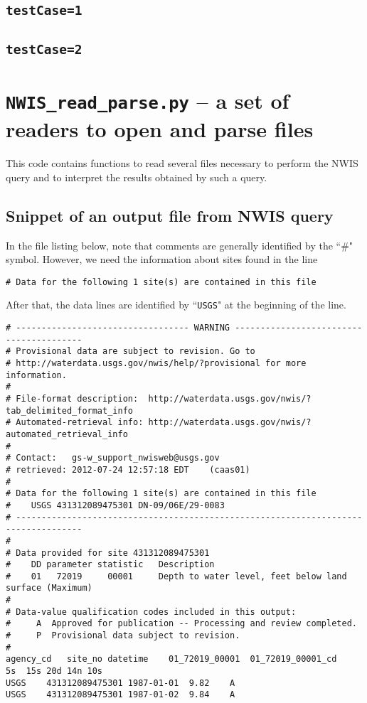 \documentclass[12pt]{article}
\begin{document}
\subsection{\texttt{testCase=1}}
\begin{center}
	
\end{center}
\subsection{\texttt{testCase=2}}
\begin{center}
	
\end{center}

\section{\texttt{NWIS\_read\_parse.py} -- a set of readers to open and parse files}
This code contains functions to read several files necessary to perform the NWIS query and to interpret the results obtained by such a query. 
\subsection{Snippet of an output file from NWIS query}
In the file listing below, note that comments are generally identified by the ``\#" symbol. However, we need the information about sites found in the line \begin{verbatim}# Data for the following 1 site(s) are contained in this file\end{verbatim}
After that, the data lines are identified by ``\texttt{USGS}" at the beginning of the line.
\begin{tiny}
\begin{Verbatim}[frame=single]
# ---------------------------------- WARNING ----------------------------------------
# Provisional data are subject to revision. Go to
# http://waterdata.usgs.gov/nwis/help/?provisional for more information.
#
# File-format description:  http://waterdata.usgs.gov/nwis/?tab_delimited_format_info
# Automated-retrieval info: http://waterdata.usgs.gov/nwis/?automated_retrieval_info
#
# Contact:   gs-w_support_nwisweb@usgs.gov
# retrieved: 2012-07-24 12:57:18 EDT	(caas01)
#
# Data for the following 1 site(s) are contained in this file
#    USGS 431312089475301 DN-09/06E/29-0083
# -----------------------------------------------------------------------------------
#
# Data provided for site 431312089475301
#    DD parameter statistic   Description
#    01   72019     00001     Depth to water level, feet below land surface (Maximum)
#
# Data-value qualification codes included in this output:
#     A  Approved for publication -- Processing and review completed.
#     P  Provisional data subject to revision.
#
agency_cd	site_no	datetime	01_72019_00001	01_72019_00001_cd
5s	15s	20d	14n	10s
USGS	431312089475301	1987-01-01	9.82	A
USGS	431312089475301	1987-01-02	9.84	A
\end{Verbatim}
\end{tiny}
\end{document}
